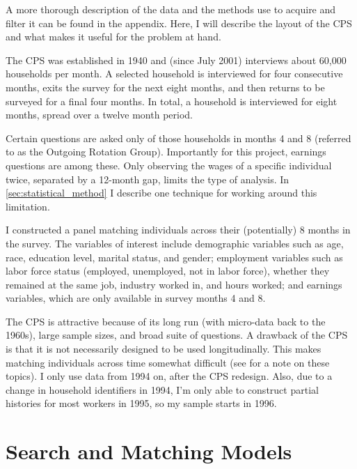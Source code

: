 \documentclass[11pt]{article}
\begin{document}
A more thorough description of the data and the methods use to acquire and filter it can be found in the appendix.
Here, I will describe the layout of the CPS and what makes it useful for the problem at hand.

The CPS was established in 1940 and (since July 2001) interviews about 60,000 households per month.
A selected household is interviewed for four consecutive months, exits the survey for the next eight months, and then returns to be surveyed for a final four months.
In total, a household is interviewed for eight months, spread over a twelve month period.

Certain questions are asked only of those households in months 4 and 8 (referred to as the Outgoing Rotation Group).
Importantly for this project, earnings questions are among these.
Only observing the wages of a specific individual twice, separated by a 12-month gap, limits the type of analysis.
In \autoref{sec:statistical_method} I describe one technique for working around this limitation.

I constructed a panel matching individuals across their (potentially) 8 months in the survey.
The variables of interest include demographic variables such as age, race, education level, marital status, and gender;
employment variables such as labor force status (employed, unemployed, not in labor force), whether they remained at the same job, industry worked in, and hours worked;
and earnings variables, which are only available in survey months 4 and 8.

The CPS is attractive because of its long run (with micro-data back to the 1960s), large sample sizes, and broad suite of questions.
A drawback of the CPS is that it is not necessarily designed to be used longitudinally.
This makes matching individuals across time somewhat difficult (see \cite{madrian1999note} for a note on these topics).
I only use data from 1994 on, after the CPS redesign.
Also, due to a change in household identifiers in 1994, I'm only able to construct partial histories for most workers in 1995, so my sample starts in 1996.


\section{Search and Matching Models}
\label{sec:search_and_matching_models}
\end{document}
